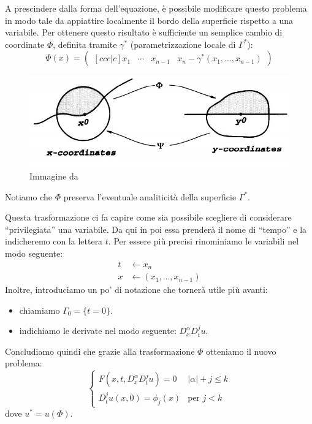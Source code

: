 A prescindere dalla forma dell'equazione, è possibile modificare questo problema in modo tale da appiattire localmente il bordo della superficie rispetto a una variabile. Per ottenere questo risultato è sufficiente un semplice cambio di coordinate $\Phi$, definita tramite $\gamma^*$ (parametrizzazione locale di $\Gamma^*$):
$$\Phi (x) = 
\left( \begin{matrix}[ccc|c]
x_1 & \cdots & x_{n-1} & x_n-\gamma^* (x_1,\ldots , x_{n-1})
\end{matrix}\right)$$
\begin{figure}[H]
\centering
\includegraphics[scale=.5]{flatb}
\caption{Immagine da \cite[cap.8]{Evans}}
\end{figure}
\begin{remark}
Notiamo che $\Phi$ preserva l'eventuale analiticità della superficie $\Gamma^*$.
\end{remark}

Questa trasformazione ci fa capire come sia possibile scegliere di considerare ``privilegiata'' una variabile. Da qui in poi essa prenderà il nome di ``tempo'' e la indicheremo con la lettera $t$. Per essere più precisi rinominiamo le variabili nel modo seguente:
\begin{align*}
t & \leftarrow x_n \\
x & \leftarrow (x_1,\ldots , x_{n-1})
\end{align*}
Inoltre, introduciamo un po' di notazione che tornerà utile più avanti:
\begin{itemize}
\item chiamiamo $\Gamma_0 = \{t=0\}$.
\item indichiamo le derivate nel modo seguente: $D^\alpha_x D^j_t u$.
\end{itemize}
Concludiamo quindi che grazie alla trasformazione $\Phi$ otteniamo il nuovo problema:
\begin{equation}\label{gamma0prob}
\begin{cases}
F(x,t, D^\alpha_x D^j_t u)=0 & |\alpha | +j \leq k\\
D^j_t u (x,0)= \phi_j(x) & \text{per }j<k 
\end{cases}
\end{equation}
dove $u^*=u(\Phi)$.

